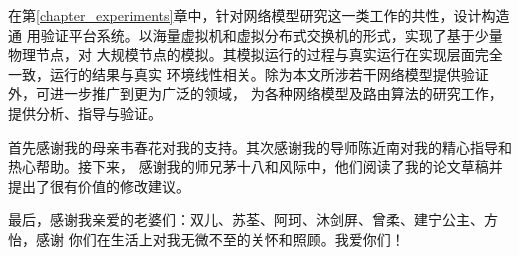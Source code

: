 \documentclass[bachelor,fandolfonts,replaceperiod]{jnuthesis} %
\begin{document}
    在第\ref{chapter_experiments}章中，针对网络模型研究这一类工作的共性，设计构造通
    用验证平台系统。以海量虚拟机和虚拟分布式交换机的形式，实现了基于少量物理节点，对
    大规模节点的模拟。其模拟运行的过程与真实运行在实现层面完全一致，运行的结果与真实
    环境线性相关。除为本文所涉若干网络模型提供验证外，可进一步推广到更为广泛的领域，
    为各种网络模型及路由算法的研究工作，提供分析、指导与验证。
    \begin{backmatter}
    
    \end{backmatter}
    \begin{acknowledgement}
        首先感谢我的母亲韦春花对我的支持。其次感谢我的导师陈近南对我的精心指导和热心帮助。接下来，
        感谢我的师兄茅十八和风际中，他们阅读了我的论文草稿并提出了很有价值的修改建议。
        
        最后，感谢我亲爱的老婆们：双儿、苏荃、阿珂、沐剑屏、曾柔、建宁公主、方怡，感谢
        你们在生活上对我无微不至的关怀和照顾。我爱你们！
    \end{acknowledgement}
    
\end{document}
